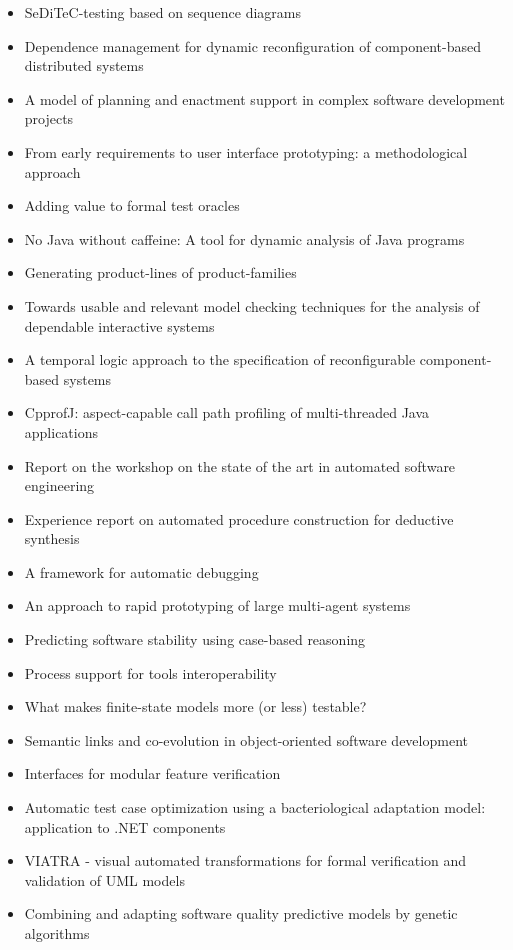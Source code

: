 {\small
\begin{itemize}[itemsep=-1ex]
  \item SeDiTeC-testing based on sequence diagrams
  \item Dependence management for dynamic reconfiguration of component-based distributed systems
  \item A model of planning and enactment support in complex software development projects
  \item From early requirements to user interface prototyping: a methodological approach
  \item Adding value to formal test oracles
  \item No Java without caffeine: A tool for dynamic analysis of Java programs
  \item Generating product-lines of product-families
  \item Towards usable and relevant model checking techniques for the analysis of dependable interactive systems
  \item A temporal logic approach to the specification of reconfigurable component-based systems
  \item CpprofJ: aspect-capable call path profiling of multi-threaded Java applications
  \item Report on the workshop on the state of the art in automated software engineering
  \item Experience report on automated procedure construction for deductive synthesis
  \item A framework for automatic debugging
  \item An approach to rapid prototyping of large multi-agent systems
  \item Predicting software stability using case-based reasoning
  \item Process support for tools interoperability
  \item What makes finite-state models more (or less) testable?
  \item Semantic links and co-evolution in object-oriented software development
  \item Interfaces for modular feature verification
  \item Automatic test case optimization using a bacteriological adaptation model: application to .NET components
  \item VIATRA - visual automated transformations for formal verification and validation of UML models
  \item Combining and adapting software quality predictive models by genetic algorithms

\end{itemize}}
